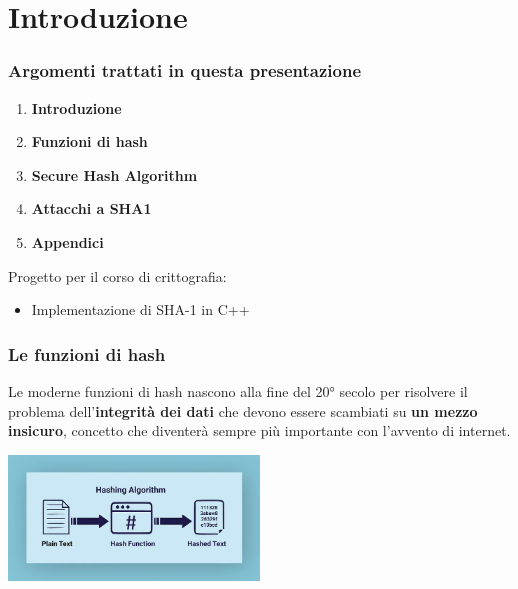 
\section{Introduzione} %


\begin{frame}
	\frametitle{Argomenti trattati in questa presentazione}

	\begin{enumerate}
		\item \textbf{Introduzione}
		\item \textbf{Funzioni di hash}
		\item \textbf{Secure Hash Algorithm}
		\item \textbf{Attacchi a SHA1}
		\item \textbf{Appendici}
	\end{enumerate}

	\vspace{1cm}

	Progetto per il corso di crittografia:
	\begin{itemize}
		\item Implementazione di SHA-1 in C++
	\end{itemize}

\end{frame}


\begin{frame}
	\frametitle{Le funzioni di hash}

	Le moderne funzioni di hash nascono alla fine del 20° secolo per risolvere il problema dell'\textbf{integrità dei dati} che devono
	essere scambiati su \textbf{un mezzo insicuro}, concetto che diventerà sempre più importante con l'avvento di internet.
	\vspace{1cm}
	\begin{center}
		\includegraphics[width=0.5\textwidth]{img/1-img/hash-function.jpeg}
	\end{center}


\end{frame}

